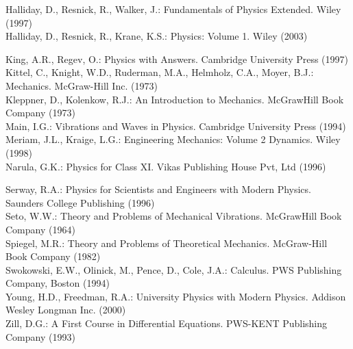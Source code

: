 \documentclass[10pt]{article}
\numberwithin{equation}{section}
\begin{document}
Halliday, D., Resnick, R., Walker, J.: Fundamentals of Physics Extended. Wiley (1997)\\
Halliday, D., Resnick, R., Krane, K.S.: Physics: Volume 1. Wiley (2003)

King, A.R., Regev, O.: Physics with Answers. Cambridge University Press (1997)\\
Kittel, C., Knight, W.D., Ruderman, M.A., Helmholz, C.A., Moyer, B.J.: Mechanics. McGraw-Hill Inc. (1973)\\
Kleppner, D., Kolenkow, R.J.: An Introduction to Mechanics. McGrawHill Book Company (1973)\\
Main, I.G.: Vibrations and Waves in Physics. Cambridge University Press (1994)\\
Meriam, J.L., Kraige, L.G.: Engineering Mechanics: Volume 2 Dynamics. Wiley (1998)\\
Narula, G.K.: Physics for Class XI. Vikas Publishing House Pvt, Ltd (1996)

Serway, R.A.: Physics for Scientists and Engineers with Modern Physics. Saunders College Publishing (1996)\\
Seto, W.W.: Theory and Problems of Mechanical Vibrations. McGrawHill Book Company (1964)\\
Spiegel, M.R.: Theory and Problems of Theoretical Mechanics. McGraw-Hill Book Company (1982)\\
Swokowski, E.W., Olinick, M., Pence, D., Cole, J.A.: Calculus. PWS Publishing Company, Boston (1994)\\
Young, H.D., Freedman, R.A.: University Physics with Modern Physics. Addison Wesley Longman Inc. (2000)\\
Zill, D.G.: A First Course in Differential Equations. PWS-KENT Publishing Company (1993)
\end{document}
